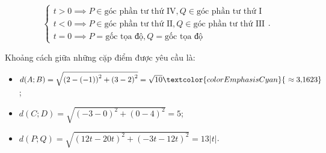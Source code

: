 $$
   \begin{cases}
      t>0 \implies P \in \text{góc phần tư thứ IV}, Q \in \text{góc phần tư thứ I} \\
      t<0 \implies P \in \text{góc phần tư thứ II}, Q \in \text{góc phần tư thứ III} \\
      t=0 \implies P = \text{gốc tọa độ}, Q = \text{gốc tọa độ}
   \end{cases}.
$$

Khoảng cách giữa những cặp điểm được yêu cầu là:
\begin{itemize}
   \item $d(A;B) = \sqrt{\left(2-(-1)\right)^2+\left(3-2\right)^2} = \sqrt{10} \textcolor{colorEmphasisCyan}{~\approx 3{,}1623}$;
   \item $d(C;D) = \sqrt{\left(-3-0\right)^2+\left(0-4\right)^2} = 5$;
   \item $d(P;Q) = \sqrt{\left(12t-20t\right)^2+\left(-3t-12t\right)^2} = 13|t|$.
\end{itemize}
